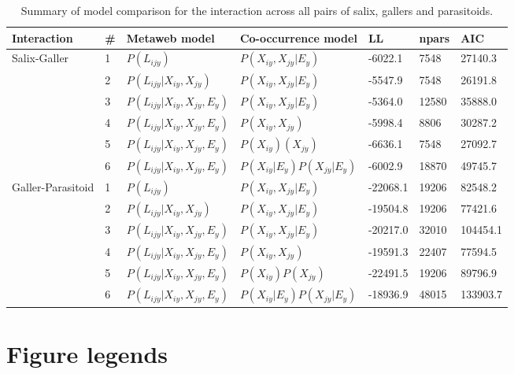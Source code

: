 \documentclass[12pt]{article}
\begin{document}
\begin{landscape}
\begin{table}[]
\centering
\caption{Summary of model comparison for the interaction across all pairs of salix, gallers and parasitoids.}
\begin{tabular}{lllllll}
\hline
	Interaction & \# & Metaweb model & Co-occurrence model & LL & npars & AIC \\ \hline
	Salix-Galler & 1 & $P(L_{ijy})$ & $P(X_{iy},X_{jy}|E_y)$ & -6022.1 & 7548 & 27140.3 \\
	 & 2 & $P(L_{ijy}|X_{iy},X_{jy})$ & $P(X_{iy},X_{jy}|E_y)$ & -5547.9 & 7548 & 26191.8 \\
	 & 3 & $P(L_{ijy} | X_{iy}, X_{jy}, E_y)$ & $P(X_{iy},X_{jy}|E_y)$ & -5364.0 & 12580 & 35888.0 \\
	 & 4 & $P(L_{ijy} | X_{iy}, X_{jy}, E_y)$ & $P(X_{iy},X_{jy})$ & -5998.4 & 8806 & 30287.2 \\
	 & 5 & $P(L_{ijy} | X_{iy}, X_{jy}, E_y)$ & $P(X_{iy})(X_{jy})$ & -6636.1 & 7548 & 27092.7 \\
	 & 6 & $P(L_{ijy} | X_{iy}, X_{jy}, E_y)$ & $P(X_{iy}|E_y)P(X_{jy}|E_y)$ & -6002.9 & 18870 & 49745.7 \\ \hline
	Galler-Parasitoid & 1 & $P(L_{ijy})$ & $P(X_{iy},X_{jy}|E_y)$ & -22068.1 & 19206 & 82548.2 \\
	 & 2 & $P(L_{ijy} | X_{iy}, X_{jy})$ & $P(X_{iy},X_{jy}|E_y)$ & -19504.8 & 19206 & 77421.6 \\
	 & 3 & $P(L_{ijy} | X_{iy}, X_{jy}, E_y)$ & $P(X_{iy},X_{jy}|E_y)$ & -20217.0 & 32010 & 104454.1 \\
	 & 4 & $P(L_{ijy} | X_{iy}, X_{jy}, E_y)$ & $P(X_{iy},X_{jy})$ & -19591.3 & 22407 & 77594.5 \\
	 & 5 & $P(L_{ijy} | X_{iy}, X_{jy}, E_y)$ & $P(X_{iy})P(X_{jy})$ & -22491.5 & 19206 & 89796.9 \\
	 & 6 & $P(L_{ijy} | X_{iy}, X_{jy}, E_y)$ & $P(X_{iy}|E_y)P(X_{jy}|E_y)$ & -18936.9 & 48015 & 133903.7 \\
\hline
\end{tabular}
\end{table}
\end{landscape}

\newpage
\section*{Figure legends}

\end{document}
